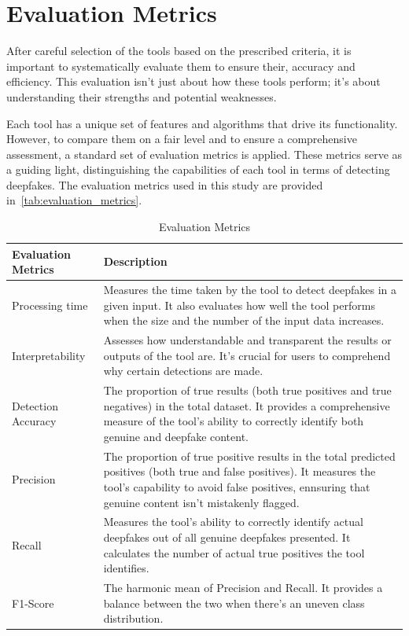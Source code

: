 \section{Evaluation Metrics}
After careful selection of the tools based on the prescribed criteria, it is
important to systematically evaluate them to ensure their, accuracy
and efficiency. This evaluation isn't just about how these tools perform; it's
about understanding their strengths and potential weaknesses.

Each tool has a unique set of features and algorithms that drive its functionality.
However, to compare them on a fair level and to ensure a comprehensive
assessment, a standard set of evaluation metrics is applied. These metrics serve
as a guiding light, distinguishing the capabilities of each tool in terms of
detecting deepfakes. The evaluation metrics used in this study are provided in~\autoref{tab:evaluation_metrics}.

\begin{table}[htpb]
	\caption{Evaluation Metrics}\label{tab:evaluation_metrics}
	\centering
	\small
	\begin{tabularx}{\textwidth}{l X}
		\toprule
		\textbf{Evaluation Metrics} & \textbf{Description}                                     \\
		\midrule
		Processing time             & Measures the time taken by the tool to detect
		deepfakes in a given input. It also evaluates how well the tool performs
		when the size and the number of the input data increases.                              \\
		\addlinespace
		Interpretability            & Assesses how understandable and transparent
		the results or outputs of the tool are. It's crucial for users to comprehend
		why certain detections are made.                                                       \\
		\addlinespace
		Detection Accuracy          & The proportion of true results (both true
		positives and true negatives) in the total dataset. It provides a comprehensive
		measure of the tool's ability to correctly identify both genuine and deepfake content. \\
		\addlinespace
		Precision                   & The proportion of true positive results in the
		total predicted positives (both true and false positives). It measures the tool's capability to avoid false positives,
		ennsuring that genuine content isn't mistakenly flagged.                               \\
		\addlinespace
		Recall                      & Measures the tool's ability to correctly
		identify actual deepfakes out of all genuine deepfakes presented. It calculates the
		number of actual true positives the tool identifies.                                   \\
		\addlinespace
		F1-Score                    & The harmonic mean of Precision and Recall.
		It provides a balance between the two when there's an uneven class distribution.       \\
		\bottomrule
	\end{tabularx}
\end{table}


